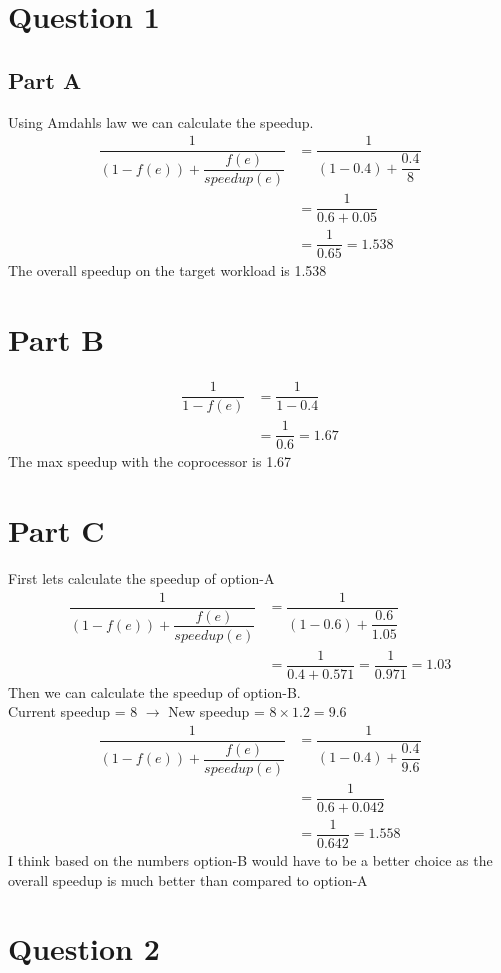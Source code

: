 \documentclass[letter]{article}
\theoremstyle{case}
\begin{document}
\section*{Question 1}
\subsection*{Part A}
Using Amdahls law we can calculate the speedup.
\begin{align*}
\dfrac{1}{(1 - f(e)) + \dfrac{f(e)}{speedup(e)}} &= \dfrac{1}{(1 - 0.4) + \dfrac{0.4}{8}}\\
&=\dfrac{1}{0.6 + 0.05}\\
&= \dfrac{1}{0.65} = 1.538
\end{align*}
The overall speedup on the target workload is 1.538
\section*{Part B}
\begin{align*}
\dfrac{1}{1 - f(e)} &= \dfrac{1}{1-0.4}\\
&= \dfrac{1}{0.6} = 1.67
\end{align*}
The max speedup with the coprocessor is 1.67

\section*{Part C}
First lets calculate the speedup of option-A
\begin{align*}
\dfrac{1}{(1 - f(e)) + \dfrac{f(e)}{speedup(e)}} &= \dfrac{1}{(1 - 0.6) + \dfrac{0.6}{1.05}}\\
&= \dfrac{1}{0.4 + 0.571} = \dfrac{1}{0.971} = 1.03
\end{align*}
Then we can calculate the speedup of option-B.\\
Current speedup = 8 $\rightarrow$ New speedup = $8 \times 1.2 = 9.6$
\begin{align*}
\dfrac{1}{(1 - f(e)) + \dfrac{f(e)}{speedup(e)}} &= \dfrac{1}{(1 - 0.4) + \dfrac{0.4}{9.6}}\\
&=\dfrac{1}{0.6 + 0.042}\\
&= \dfrac{1}{0.642} = 1.558
\end{align*}
I think based on the numbers option-B would have to be a better choice as the overall speedup is much better than compared to option-A
\section*{Question 2}
\end{document}
